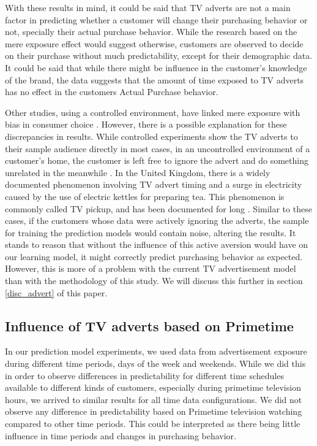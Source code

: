 \documentclass[review]{elsarticle}
\begin{document}
With these results in mind, it could be said that TV adverts are not a main factor in predicting whether a customer will change their purchasing behavior or not, specially their actual purchase behavior. While the research based on the mere exposure effect would suggest otherwise, customers are observed to decide on their purchase without much predictability, except for their demographic data. It could be said that while there might be influence in the customer's knowledge of the brand, the data suggests that the amount of time exposed to TV adverts has no effect in the customers Actual Purchase behavior.

Other studies, using a controlled environment, have linked mere exposure with bias in consumer choice \cite{janiszewski}. However, there is a possible explanation for these discrepancies in results. While controlled experiments show the TV adverts to their sample audience directly in most cases, in an uncontrolled environment of a customer's home, the customer is left free to ignore the advert and do something unrelated in the meanwhile \cite{abernethy}. In the United Kingdom, there is a widely documented phenomenon involving TV advert timing and a surge in electricity caused by the use of electric kettles for preparing tea. This phenomenon is commonly called TV pickup, and has been documented for long \cite{bunn,boait}. Similar to these cases, if the customers whose data were actively ignoring the adverts, the sample for training the prediction models would contain noise, altering the results. It stands to reason that without the influence of this active aversion would have on our learning model, it might correctly predict purchasing behavior as expected. However, this is more of a problem with the current TV advertisement model than with the methodology of this study. We will discuss this further in section \ref{disc_advert} of this paper.


\subsection{Influence of TV adverts based on Primetime}
\label{disc_prime}

In our prediction model experiments, we used data from advertisement exposure during different time periods, days of the week and weekends. While we did this in order to observe differences in predictability for different time schedules available to different kinds of customers, especially during primetime television hours, we arrived to similar results for all time data configurations. We did not observe any difference in predictability based on Primetime television watching compared to other time periods. This could be interpreted as there being little influence in time periods and changes in purchasing behavior. 
\end{document}
